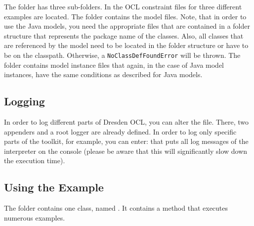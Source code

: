 The  folder has three sub-folders. In
 the OCL constraint files for three different examples
are located. The  folder contains the model files. Note, that 
in order to use the Java models, you need the appropriate  files
that are contained in a folder structure that represents the package name of the
classes. Also, all classes that are referenced by the model need to be located
in the folder structure or have to be on the classpath. Otherwise, a 
\lstinline[breaklines=true]{NoClassDefFoundError} will be thrown. The 
 folder contains model instance files that again, in
the case of Java model instances, have the same conditions as described for 
Java models.


\subsection{Logging}

In order to log different parts of Dresden OCL, you can alter the
 file. There, two appenders and a root logger are 
already defined. In order to log only specific parts of the toolkit, for
example, you can enter: 
 that puts all log messages of the interpreter on the console (please 
be aware that this will significantly slow down the execution time).


\subsection{Using the Example}

The  folder contains one class, named 
. It contains a  method that 
executes numerous examples.

